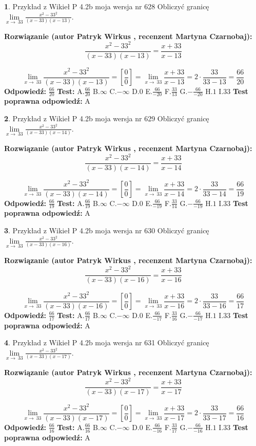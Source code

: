 \documentclass[12pt, a4paper]{article}
\theoremstyle{definition} %
\newtheorem{zad}{}
\newcommand{\zadStart}[1]{\begin{zad}#1\newline}
\newcommand{\zadStop}{\end{zad}}
\newcommand{\rozwStart}[2]{\noindent \textbf{Rozwiązanie (autor #1 , recenzent #2): }\newline}
\newcommand{\rozwStop}{\newline}
\newcommand{\odpStart}{\noindent \textbf{Odpowiedź:}\newline}
\newcommand{\odpStop}{\newline}
\newcommand{\testStart}{\noindent \textbf{Test:}\newline}
\newcommand{\testStop}{\newline}
\newcommand{\kluczStart}{\noindent \textbf{Test poprawna odpowiedź:}\newline}
\newcommand{\kluczStop}{\newline}
\begin{document}
\zadStart{Przykład z Wikieł P 4.2b moja wersja nr 628}
Obliczyć granicę $\lim\limits_{x\to\ 33}\frac{x^{2}-33^{2}}{(x-33)(x-13)}$.
\zadStop
\rozwStart{Patryk Wirkus}{Martyna Czarnobaj}
$$\frac{x^{2}-33^{2}}{(x-33)(x-13)}=\frac{x+33}{x-13}$$

$$\lim\limits_{x\to\ 33}\frac{x^{2}-33^{2}}{(x-33)(x-13)}=[\frac{0}{0}]=\lim\limits_{x\to\ 33}\frac{x+33}{x-13}=2 \cdot \frac{33}{33-13} = \frac{66}{20}$$
\rozwStop
\odpStart
$\frac{66}{20}$
\odpStop
\testStart
A.$\frac{66}{20}$
B.$\infty$
C.$-\infty$
D.$0$
E.$\frac{66}{-20}$
F.$\frac{33}{13}$
G.$-\frac{66}{-20}$
H.$1$
I.$33$
\testStop
\kluczStart
A
\kluczStop



\zadStart{Przykład z Wikieł P 4.2b moja wersja nr 629}
Obliczyć granicę $\lim\limits_{x\to\ 33}\frac{x^{2}-33^{2}}{(x-33)(x-14)}$.
\zadStop
\rozwStart{Patryk Wirkus}{Martyna Czarnobaj}
$$\frac{x^{2}-33^{2}}{(x-33)(x-14)}=\frac{x+33}{x-14}$$

$$\lim\limits_{x\to\ 33}\frac{x^{2}-33^{2}}{(x-33)(x-14)}=[\frac{0}{0}]=\lim\limits_{x\to\ 33}\frac{x+33}{x-14}=2 \cdot \frac{33}{33-14} = \frac{66}{19}$$
\rozwStop
\odpStart
$\frac{66}{19}$
\odpStop
\testStart
A.$\frac{66}{19}$
B.$\infty$
C.$-\infty$
D.$0$
E.$\frac{66}{-19}$
F.$\frac{33}{14}$
G.$-\frac{66}{-19}$
H.$1$
I.$33$
\testStop
\kluczStart
A
\kluczStop



\zadStart{Przykład z Wikieł P 4.2b moja wersja nr 630}
Obliczyć granicę $\lim\limits_{x\to\ 33}\frac{x^{2}-33^{2}}{(x-33)(x-16)}$.
\zadStop
\rozwStart{Patryk Wirkus}{Martyna Czarnobaj}
$$\frac{x^{2}-33^{2}}{(x-33)(x-16)}=\frac{x+33}{x-16}$$

$$\lim\limits_{x\to\ 33}\frac{x^{2}-33^{2}}{(x-33)(x-16)}=[\frac{0}{0}]=\lim\limits_{x\to\ 33}\frac{x+33}{x-16}=2 \cdot \frac{33}{33-16} = \frac{66}{17}$$
\rozwStop
\odpStart
$\frac{66}{17}$
\odpStop
\testStart
A.$\frac{66}{17}$
B.$\infty$
C.$-\infty$
D.$0$
E.$\frac{66}{-17}$
F.$\frac{33}{16}$
G.$-\frac{66}{-17}$
H.$1$
I.$33$
\testStop
\kluczStart
A
\kluczStop



\zadStart{Przykład z Wikieł P 4.2b moja wersja nr 631}
Obliczyć granicę $\lim\limits_{x\to\ 33}\frac{x^{2}-33^{2}}{(x-33)(x-17)}$.
\zadStop
\rozwStart{Patryk Wirkus}{Martyna Czarnobaj}
$$\frac{x^{2}-33^{2}}{(x-33)(x-17)}=\frac{x+33}{x-17}$$

$$\lim\limits_{x\to\ 33}\frac{x^{2}-33^{2}}{(x-33)(x-17)}=[\frac{0}{0}]=\lim\limits_{x\to\ 33}\frac{x+33}{x-17}=2 \cdot \frac{33}{33-17} = \frac{66}{16}$$
\rozwStop
\odpStart
$\frac{66}{16}$
\odpStop
\testStart
A.$\frac{66}{16}$
B.$\infty$
C.$-\infty$
D.$0$
E.$\frac{66}{-16}$
F.$\frac{33}{17}$
G.$-\frac{66}{-16}$
H.$1$
I.$33$
\testStop
\kluczStart
A
\kluczStop
\end{document}
